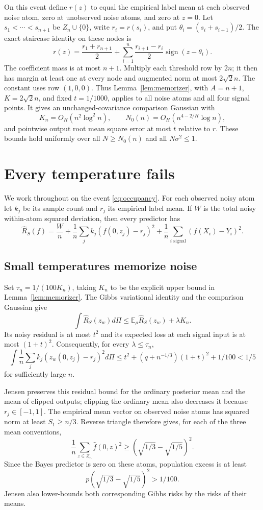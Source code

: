 \documentclass[11pt]{article}
\newcommand{\E}{\mathbb E}\newcommand{\Pp}{\mathbb P}\newcommand{\R}{\mathbb R}
\begin{document}
On this event define $r(z)$ to equal the empirical label mean at each observed noise atom, zero at unobserved noise atoms, and zero at $z=0$. Let $s_1<\cdots<s_{n+1}$ be $Z_n\cup\{0\}$, write $r_i=r(s_i)$, and put $\theta_i=(s_i+s_{i+1})/2$. The exact staircase identity on these nodes is
\[
 r(z)=\frac{r_1+r_{n+1}}2+
       \sum_{i=1}^{n}\frac{r_{i+1}-r_i}2\operatorname{sign}(z-\theta_i).
\]
The coefficient mass is at most $n+1$. Multiply each threshold row by $2n$; it then has margin at least one at every node and augmented norm at most $2\sqrt2 n$. The constant uses row $(1,0,0)$. Thus Lemma~\ref{lem:memorizer}, with $A=n+1$, $K=2\sqrt2 n$, and fixed $t=1/1000$, applies to all noise atoms and all four signal points. It gives an unchanged-covariance comparison Gaussian with
\begin{equation}
 K_n=O_H(n^2\log^2n),\qquad
 N_0(n)=O_H(n^{4-2/H}\log n),
 \label{eq:resources}
\end{equation}
and pointwise output root mean square error at most $t$ relative to $r$. These bounds hold uniformly over all $N\ge N_0(n)$ and all $N\sigma^2\le1$.

\section{Every temperature fails}
We work throughout on the event \eqref{eq:occupancy}. For each observed noisy atom let $k_j$ be its sample count and $r_j$ its empirical label mean. If $W$ is the total noisy within-atom squared deviation, then every predictor has
\[
 \widehat R_S(f)=\frac Wn+\frac1n\sum_j k_j(f(0,z_j)-r_j)^2
                  +\frac1n\sum_{i\text{ signal}}(f(X_i)-Y_i)^2.
\]

\subsection{Small temperatures memorize noise}
Set $\tau_n=1/(100K_n)$, taking $K_n$ to be the explicit upper bound in Lemma~\ref{lem:memorizer}. The Gibbs variational identity and the comparison Gaussian give
\[
 \int\widehat R_S(z_w)d\Pi\le\E_\rho\widehat R_S(z_w)+\lambda K_n.
\]
Its noisy residual is at most $t^2$ and its expected loss at each signal input is at most $(1+t)^2$. Consequently, for every $\lambda\le\tau_n$,
\[
 \int\frac1n\sum_j k_j(z_w(0,z_j)-r_j)^2d\Pi
 \le t^2+(q+n^{-1/3})(1+t)^2+1/100<1/5
\]
for sufficiently large $n$.

Jensen preserves this residual bound for the ordinary posterior mean and the mean of clipped outputs; clipping the ordinary mean also decreases it because $r_j\in[-1,1]$. The empirical mean vector on observed noise atoms has squared norm at least $S_1\ge n/3$. Reverse triangle therefore gives, for each of the three mean conventions,
\[
 \frac1n\sum_{z\in Z_n}\widehat f(0,z)^2
 \ge\left(\sqrt{1/3}-\sqrt{1/5}\right)^2.
\]
Since the Bayes predictor is zero on these atoms, population excess is at least
\[
 p\left(\sqrt{1/3}-\sqrt{1/5}\right)^2>1/100.
\]
Jensen also lower-bounds both corresponding Gibbs risks by the risks of their means.
\end{document}

